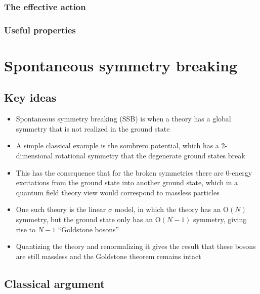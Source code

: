 \documentclass[12pt]{memoir}
\begin{document}
\subsection{The effective action}

\subsection{Useful properties}

\chapter{Spontaneous symmetry breaking}

\section{Key ideas}

\begin{itemize}
  \item Spontaneous symmetry breaking (SSB) is when a theory has a global symmetry
    that is not realized in the ground state
  \item A simple classical example is the sombrero potential,
    which has a 2-dimensional rotational symmetry that the degenerate ground states break
  \item This has the consequence that for the broken symmetries
    there are 0-energy excitations from the ground state into another ground state,
    which in a quantum field theory view would correspond to massless particles
  \item One such theory is the linear $\sigma$ model,
    in which the theory has an $\text{O}(N)$ symmetry,
    but the ground state only has an $\text{O}(N-1)$ symmetry,
    giving rise to $N-1$ ``Goldstone bosons''
  \item Quantizing the theory and renormalizing it gives the result that
    these bosons are still massless and the Goldstone theorem remains intact
\end{itemize}

\section{Classical argument}
\end{document}
